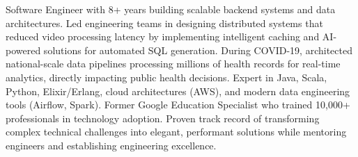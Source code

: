 \documentclass[letter,10pt]{article}
\begin{document}

Software Engineer with 8+ years building scalable backend systems and data architectures. Led engineering teams in designing distributed systems that reduced video processing latency by implementing intelligent caching and AI-powered solutions for automated SQL generation. During COVID-19, architected national-scale data pipelines processing millions of health records for real-time analytics, directly impacting public health decisions. Expert in Java, Scala, Python, Elixir/Erlang, cloud architectures (AWS), and modern data engineering tools (Airflow, Spark). Former Google Education Specialist who trained 10,000+ professionals in technology adoption. Proven track record of transforming complex technical challenges into elegant, performant solutions while mentoring engineers and establishing engineering excellence.
\end{document}
